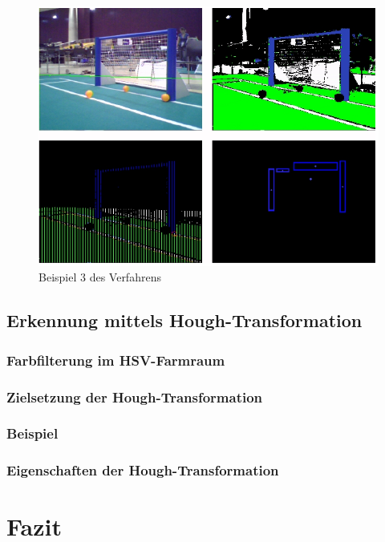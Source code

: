 \documentclass[a4paper,12pt]{article}
\begin{document}
\begin{figure}[H]
\includegraphics[scale=0.8]{example-detection4.png}
\caption{Beispiel 3 des Verfahrens}
\label{fig:example4}
\end{figure}

\subsection{Erkennung mittels Hough-Transformation}
\subsubsection{Farbfilterung im HSV-Farmraum}
\subsubsection{Zielsetzung der Hough-Transformation}
\subsubsection{Beispiel}
\subsubsection{Eigenschaften der Hough-Transformation}

\section{Fazit}
\end{document}
